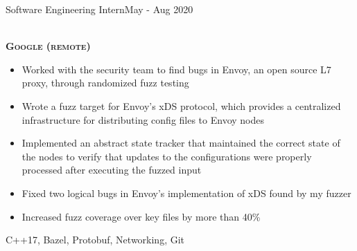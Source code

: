%
%
%

\begin{projects}

    \work
	{Software Engineering Intern}{May - Aug 2020}
	{
		\\ \textbf{\textsc{Google (remote)}}
	    \begin{itemize}
			\item Worked with the security team to find bugs in Envoy, an open source L7 proxy, through randomized fuzz testing
			\item Wrote a fuzz target for Envoy's xDS protocol, which provides a centralized infrastructure for distributing config files to Envoy nodes
			\item Implemented an abstract state tracker that maintained the correct state of the nodes to verify that updates to the configurations were properly processed after executing the fuzzed input
			\item Fixed two logical bugs in Envoy's implementation of xDS found by my fuzzer
			\item Increased fuzz coverage over key files by more than 40\%
        \end{itemize}
    }
	{C++17, Bazel, Protobuf, Networking, Git} \\

\end{projects}
